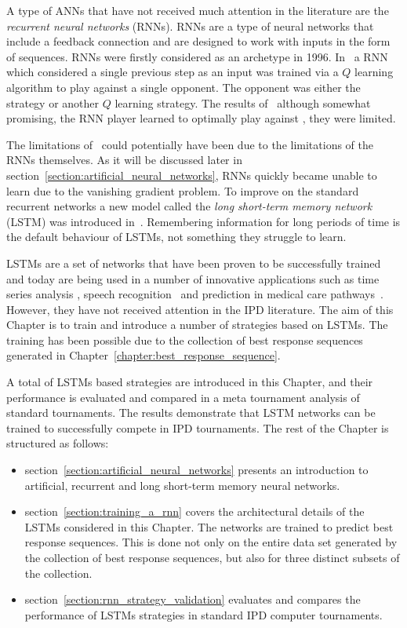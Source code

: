 A type of ANNs that have not received much attention in the literature are the
\textit{recurrent neural networks} (RNNs). RNNs are a type of neural networks
that include a feedback connection and are designed to work with inputs in
the form of sequences. RNNs were firstly considered as an archetype in 1996.
In~\cite{Sandholm1996} a RNN which considered a single previous step
as an input was trained via a \(Q\) learning algorithm to play against a single
opponent. The opponent was either the strategy \TitForTat or another \(Q\)
learning strategy. The results of~\cite{Sandholm1996} although somewhat
promising, the RNN player learned to optimally play against \TitForTat,
they were limited.

The limitations of~\cite{Sandholm1996} could potentially have been due to the
limitations of the RNNs themselves. As it will be discussed later in
section~\ref{section:artificial_neural_networks}, RNNs
quickly became unable to learn due to the vanishing gradient problem.
To improve on the standard recurrent networks a new model called the
\textit{long short-term memory network} (LSTM) was introduced in~\cite{Hochreiter1997}.
Remembering information for long periods of time
is the default behaviour of LSTMs, not something they struggle to learn.

LSTMs are a set of networks that have been proven to be successfully trained and
today are being used in a number of innovative applications such as time series
analysis \cite{Malhotra2015}, speech recognition~\cite{Sak2014} and prediction
in medical care pathways~\cite{Wang2018_lstm}. However, they have not received
attention in the IPD literature. The aim of this Chapter is to train and
introduce a number of strategies based on LSTMs. The training has been possible
due to the collection of best response sequences generated in
Chapter~\ref{chapter:best_response_sequence}.

A total of \lstmstrategies LSTMs based strategies are introduced in this
Chapter, and their performance is evaluated and compared in a meta tournament
analysis of \metatournamentslstm standard tournaments. The results demonstrate
that LSTM networks can be trained to successfully compete in IPD tournaments.
The rest of the Chapter is structured as follows:

\begin{itemize}
    \item section~\ref{section:artificial_neural_networks} presents an
    introduction to artificial, recurrent and long short-term memory neural networks.
    \item section~\ref{section:training_a_rnn} covers the architectural details
    of the LSTMs considered in this Chapter. The networks are trained to predict
    best response sequences. This is done not only on the entire data set
    generated by the collection of best response sequences, but also for three
    distinct subsets of the collection.
    \item section~\ref{section:rnn_strategy_validation} evaluates and compares
    the performance of \lstmstrategies LSTMs strategies in
    \metatournamentslstm standard IPD computer tournaments.
\end{itemize}

